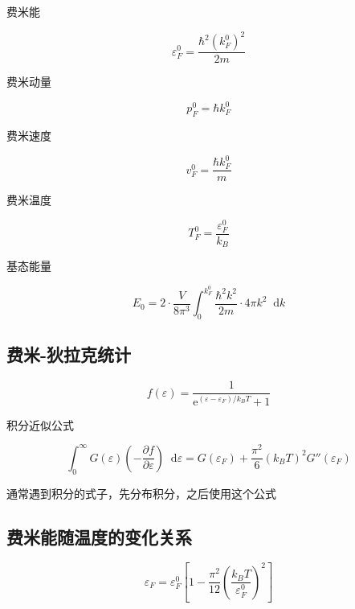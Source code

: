 \documentclass{article}
\newcommand*{\md}{\mathop{}\!\mathrm{d}}
\newcommand*{\me}{\mathrm{e}}
\begin{document}
\begin{multicols}{2}
费米能

\begin{equation*}
  \varepsilon_F^0 = \frac{\hbar^2 \left( k_F^0 \right)^2}{2m}
\end{equation*}

费米动量

\begin{equation*}
  p_F^0 = \hbar k_F^0
\end{equation*}

费米速度

\begin{equation*}
  v_F^0 = \frac{\hbar k_F^0}{m}
\end{equation*}

费米温度

\begin{equation*}
  T_F^0 = \frac{\varepsilon_F^0}{k_B}
\end{equation*}

基态能量

\begin{equation*}
  E_0 = 2\cdot \frac{V}{8\pi^3} \int_0^{k_F^0} \frac{\hbar^2 k^2}{2m} \cdot 4\pi k^2 \md k
\end{equation*}

\subsection{费米-狄拉克统计}

\begin{equation*}
  f \left( \varepsilon \right) = \frac{1}{\me^{\left( \varepsilon - \varepsilon_F \right)/k_B T} + 1}
\end{equation*}

积分近似公式

\begin{equation*}
  \int_0^{\infty} G \left( \varepsilon \right) \left( - \frac{\partial f}{\partial \varepsilon} \right) \md \varepsilon = G \left( \varepsilon_F \right) + \frac{\pi^2}{6} \left( k_B T \right)^2 G'' \left( \varepsilon_F \right)
\end{equation*}

通常遇到积分的式子，先分布积分，之后使用这个公式

\subsection{费米能随温度的变化关系}

\begin{equation*}
  \varepsilon_F = \varepsilon_F^0 \left[ 1 - \frac{\pi^2}{12} \left( \frac{k_B T}{\varepsilon_F^0} \right)^2 \right]
\end{equation*}


\end{multicols}
\end{document}
